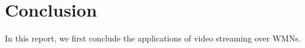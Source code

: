 \section{Conclusion}
In this report, we first conclude the applications of video
streaming over WMNs.
